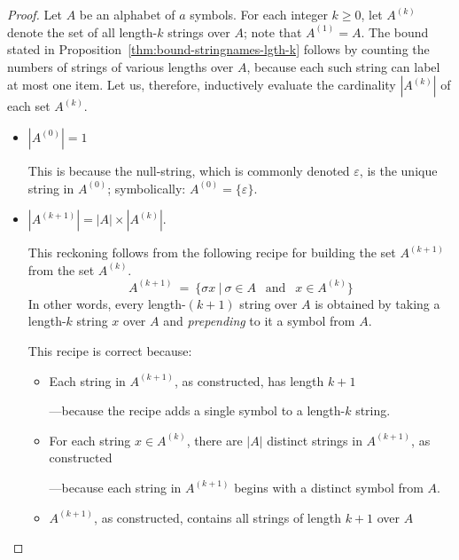 \begin{proof}
Let $A$ be an alphabet of $a$ symbols.  For each integer $k \geq 0$, let $A^{(k)}$ denote the set of all length-$k$ strings over $A$; note that $A^{(1)} = A$.  The bound stated in Proposition~\ref{thm:bound-stringnames-lgth-k} follows by counting the numbers of strings of various lengths over $A$, because each such string can label at most one item.  Let us, therefore, inductively evaluate the cardinality $|A^{(k)}|$ of each set $A^{(k)}$.
\begin{itemize}
\item
$|A^{(0)}| =1$

\smallskip

This is because the null-string, which is commonly denoted $\varepsilon$,  is the unique string in $A^{(0)}$; symbolically: $A^{(0)} = \{ \varepsilon \}$.

\medskip\item
$|A^{(k+1)}| = |A| \times |A^{(k)}|$.

\smallskip

This reckoning follows from the following recipe for building the set $A^{(k+1)}$ from the set $A^{(k)}$.
\[
A^{(k+1)} \ = \ \{ \sigma x \ | \ \sigma \in A \ \ \mbox{ and } \ \ x \in A^{(k)} \}
\]
In other words, every length-$(k+1)$ string over $A$ is obtained by taking a length-$k$ string $x$ over $A$ and {\em prepending} to it a symbol from $A$.

\smallskip

This recipe is correct because:
  \begin{itemize}
  \item
Each string in $A^{(k+1)}$, as constructed, has length $k+1$

\smallskip

---because the recipe adds a single symbol to a length-$k$ string.
  \medskip\item
For each string $x \in A^{(k)}$, there are $|A|$ distinct strings in $A^{(k+1)}$, as constructed

\smallskip

---because each string in $A^{(k+1)}$ begins with a distinct symbol from $A$.

  \medskip\item
$A^{(k+1)}$, as constructed, contains all strings of length $k+1$ over $A$

\smallskip


\end{itemize}
\end{itemize}
\end{proof}
